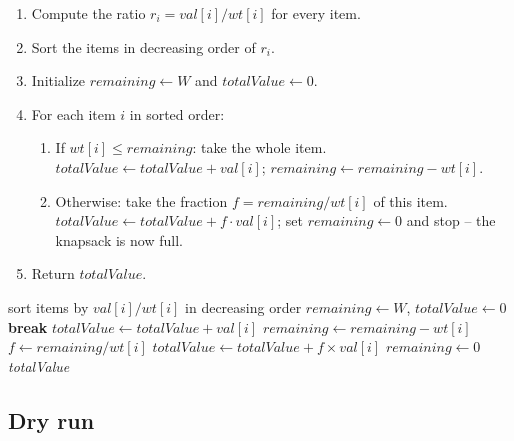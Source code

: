 \begin{enumerate}
  \item Compute the ratio $r_i = \textit{val}[i] / \textit{wt}[i]$ for every
        item.
  \item Sort the items in decreasing order of $r_i$.
  \item Initialize $\textit{remaining} \gets W$ and
        $\textit{totalValue} \gets 0$.
  \item For each item $i$ in sorted order:
  \begin{enumerate}
    \item If $\textit{wt}[i] \le \textit{remaining}$: take the whole item.
          $\textit{totalValue} \gets \textit{totalValue} + \textit{val}[i]$;
          $\textit{remaining} \gets \textit{remaining} - \textit{wt}[i]$.
    \item Otherwise: take the fraction
          $f = \textit{remaining} / \textit{wt}[i]$ of this item.
          $\textit{totalValue} \gets \textit{totalValue} + f \cdot
          \textit{val}[i]$; set $\textit{remaining} \gets 0$ and stop --
          the knapsack is now full.
  \end{enumerate}
  \item Return $\textit{totalValue}$.
\end{enumerate}

\begin{algorithm}[H]
\caption{Fractional Knapsack}
\begin{algorithmic}[1]
  \State sort items by $\textit{val}[i]/\textit{wt}[i]$ in decreasing order
  \State $\textit{remaining} \gets W$, $\textit{totalValue} \gets 0$
      \State \textbf{break}
    \EndIf
      \State $\textit{totalValue} \gets \textit{totalValue} + \textit{val}[i]$
      \State $\textit{remaining} \gets \textit{remaining} - \textit{wt}[i]$
    \Else
      \State $f \gets \textit{remaining} / \textit{wt}[i]$
      \State $\textit{totalValue} \gets \textit{totalValue} + f \times \textit{val}[i]$
      \State $\textit{remaining} \gets 0$
    \EndIf
  \EndFor
  \State \Return \textit{totalValue}
\EndProcedure
\end{algorithmic}
\end{algorithm}

\subsection*{Dry run}

